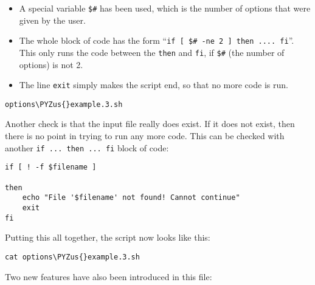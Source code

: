 \documentclass[11pt]{article}
\makeatletter
\providecommand{\tightlist}{%
      \setlength{\itemsep}{0pt}\setlength{\parskip}{0pt}}
\def\PYZus{\char`\_}
\newcommand{\boxspacing}{\kern\kvtcb@left@rule\kern\kvtcb@boxsep}
\newcommand{\prompt}[4]{
        {\ttfamily\llap{{\color{blue}\LARGE\faKeyboardO\hspace{3pt}#4}}\vspace{-\baselineskip}}
    }
\makeatother
\begin{document}
\begin{itemize}
\tightlist
\item
  A special variable \texttt{\$\#} has been used, which is the number of
  options that were given by the user.
\item
  The whole block of code has the form
  ``\texttt{if\ {[}\ \$\#\ -ne\ 2\ {]}\ then\ ....\ fi}''. This only
  runs the code between the \texttt{then} and \texttt{fi}, if
  \texttt{\$\#} (the number of options) is not 2.
\item
  The line \texttt{exit} simply makes the script end, so that no more
  code is run.
\end{itemize}

    \begin{tcolorbox}[breakable, size=fbox, boxrule=1pt, pad at break*=1mm,colback=cellbackground, colframe=cellborder]
\prompt{In}{incolor}{ }{\boxspacing}
\begin{Verbatim}[commandchars=\\\{\}]
options\PYZus{}example.3.sh
\end{Verbatim}
\end{tcolorbox}

    Another check is that the input file really does exist. If it does not
exist, then there is no point in trying to run any more code. This can
be checked with another \texttt{if\ ...\ then\ ...\ fi} block of code:

\begin{verbatim}
if [ ! -f $filename ]

then
    echo "File '$filename' not found! Cannot continue"
    exit
fi
\end{verbatim}

Putting this all together, the script now looks like this:

    \begin{tcolorbox}[breakable, size=fbox, boxrule=1pt, pad at break*=1mm,colback=cellbackground, colframe=cellborder]
\prompt{In}{incolor}{ }{\boxspacing}
\begin{Verbatim}[commandchars=\\\{\}]
cat options\PYZus{}example.3.sh
\end{Verbatim}
\end{tcolorbox}

    Two new features have also been introduced in this file:
\end{document}
